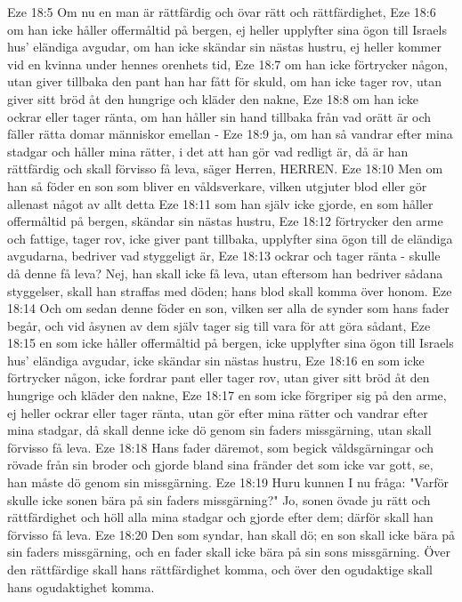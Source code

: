 Eze 18:5  Om nu en man är rättfärdig och övar rätt och rättfärdighet,
Eze 18:6  om han icke håller offermåltid på bergen, ej heller upplyfter sina ögon till Israels hus' eländiga avgudar, om han icke skändar sin nästas hustru, ej heller kommer vid en kvinna under hennes orenhets tid,
Eze 18:7  om han icke förtrycker någon, utan giver tillbaka den pant han har fått för skuld, om han icke tager rov, utan giver sitt bröd åt den hungrige och kläder den nakne,
Eze 18:8  om han icke ockrar eller tager ränta, om han håller sin hand tillbaka från vad orätt är och fäller rätta domar människor emellan -
Eze 18:9  ja, om han så vandrar efter mina stadgar och håller mina rätter, i det att han gör vad redligt är, då är han rättfärdig och skall förvisso få leva, säger Herren, HERREN.
Eze 18:10  Men om han så föder en son som bliver en våldsverkare, vilken utgjuter blod eller gör allenast något av allt detta
Eze 18:11  som han själv icke gjorde, en som håller offermåltid på bergen, skändar sin nästas hustru,
Eze 18:12  förtrycker den arme och fattige, tager rov, icke giver pant tillbaka, upplyfter sina ögon till de eländiga avgudarna, bedriver vad styggeligt är,
Eze 18:13  ockrar och tager ränta - skulle då denne få leva? Nej, han skall icke få leva, utan eftersom han bedriver sådana styggelser, skall han straffas med döden; hans blod skall komma över honom.
Eze 18:14  Och om sedan denne föder en son, vilken ser alla de synder som hans fader begår, och vid åsynen av dem själv tager sig till vara för att göra sådant,
Eze 18:15  en som icke håller offermåltid på bergen, icke upplyfter sina ögon till Israels hus' eländiga avgudar, icke skändar sin nästas hustru,
Eze 18:16  en som icke förtrycker någon, icke fordrar pant eller tager rov, utan giver sitt bröd åt den hungrige och kläder den nakne,
Eze 18:17  en som icke förgriper sig på den arme, ej heller ockrar eller tager ränta, utan gör efter mina rätter och vandrar efter mina stadgar, då skall denne icke dö genom sin faders missgärning, utan skall förvisso få leva.
Eze 18:18  Hans fader däremot, som begick våldsgärningar och rövade från sin broder och gjorde bland sina fränder det som icke var gott, se, han måste dö genom sin missgärning.
Eze 18:19  Huru kunnen I nu fråga: "Varför skulle icke sonen bära på sin faders missgärning?" Jo, sonen övade ju rätt och rättfärdighet och höll alla mina stadgar och gjorde efter dem; därför skall han förvisso få leva.
Eze 18:20  Den som syndar, han skall dö; en son skall icke bära på sin faders missgärning, och en fader skall icke bära på sin sons missgärning. Över den rättfärdige skall hans rättfärdighet komma, och över den ogudaktige skall hans ogudaktighet komma.
